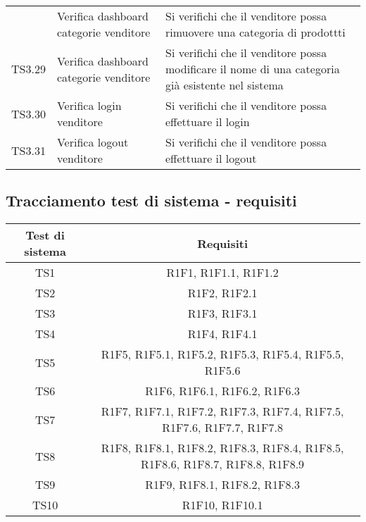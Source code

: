 \begin{center}
\begin{longtable}{|p{1cm}|p{6.85cm}|p{7cm}|}
\begin{longtable}{p{1cm}|p{6.85cm}|p{7cm}|}
	TS3.28 & Verifica dashboard categorie venditore & Si verifichi che il venditore possa rimuovere una categoria di prodottti \\
	TS3.29 & Verifica dashboard categorie venditore & Si verifichi che il venditore possa modificare il nome di una categoria già esistente nel sistema \\
	TS3.30 & Verifica login venditore & Si verifichi che il venditore possa effettuare il login \\
	TS3.31 & Verifica logout venditore & Si verifichi che il venditore possa effettuare il logout \\
	\hline

	\end{longtable}
\end{center}


\subsection{Tracciamento test di sistema - requisiti}

\begin{center}
	\begin{longtable}{|c|c|}
	\hline
	\rowcolor{lighter-grayer}
	\textbf{Test di sistema} & \textbf{Requisiti} \\
	\hline
	\endfirsthead



	\hline
	TS1 & R1F1, R1F1.1, R1F1.2  \\
	TS2 & R1F2, R1F2.1 \\
	TS3 & R1F3, R1F3.1 \\
	TS4 & R1F4, R1F4.1 \\
	TS5 & R1F5, R1F5.1, R1F5.2, R1F5.3, R1F5.4, R1F5.5, R1F5.6 \\
	TS6 & R1F6, R1F6.1, R1F6.2, R1F6.3 \\
	TS7 & R1F7, R1F7.1, R1F7.2, R1F7.3, R1F7.4, R1F7.5, R1F7.6, R1F7.7, R1F7.8 \\
	TS8 & R1F8, R1F8.1, R1F8.2, R1F8.3, R1F8.4, R1F8.5, R1F8.6, R1F8.7, R1F8.8, R1F8.9 \\
	TS9 & R1F9, R1F8.1, R1F8.2, R1F8.3 \\
	TS10 & R1F10, R1F10.1 \\

	
	\hline
	
	

	\hline

	\end{longtable}
\end{center}

